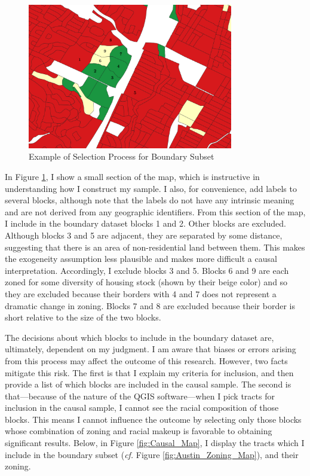 \documentclass[11pt]{article}
\begin{document}
\begin{figure}[h]
    \centering
    \includegraphics[width=0.8\textwidth]{selection_examplePNG.png}
    \caption{Example of Selection Process for Boundary Subset}
    \label{fig:Selection_Example1}
\end{figure}

In Figure \ref{fig:Selection_Example1}, I show a small section of the map, which is instructive in understanding how I construct my sample. I also, for convenience, add labels to several blocks, although note that the labels do not have any intrinsic meaning and are not derived from any geographic identifiers. From this section of the map, I include in the boundary dataset blocks 1 and 2. Other blocks are excluded. Although blocks 3 and 5 are adjacent, they are separated by some distance, suggesting that there is an area of non-residential land between them. This makes the exogeneity assumption less plausible and makes more difficult a causal interpretation. Accordingly, I exclude blocks 3 and 5. Blocks 6 and 9 are each zoned for some diversity of housing stock (shown by their beige color) and so they are excluded because their borders with 4 and 7 does not represent a dramatic change in zoning. Blocks 7 and 8 are excluded because their border is short relative to the size of the two blocks.

The decisions about which blocks to include in the boundary dataset are, ultimately, dependent on my judgment. I am aware that biases or errors arising from this process may affect the outcome of this research. However, two facts mitigate this risk. The first is that I explain my criteria for inclusion, and then provide a list of which blocks are included in the causal sample. The second is that---because of the nature of the QGIS software---when I pick tracts for inclusion in the causal sample, I cannot see the racial composition of those blocks. This means I cannot influence the outcome by selecting only those blocks whose combination of zoning and racial makeup is favorable to obtaining significant results. Below, in Figure \ref{fig:Causal_Map}, I display the tracts which I include in the boundary subset (\textit{cf.} Figure \ref{fig:Austin_Zoning_Map}), and their zoning.
\end{document}
